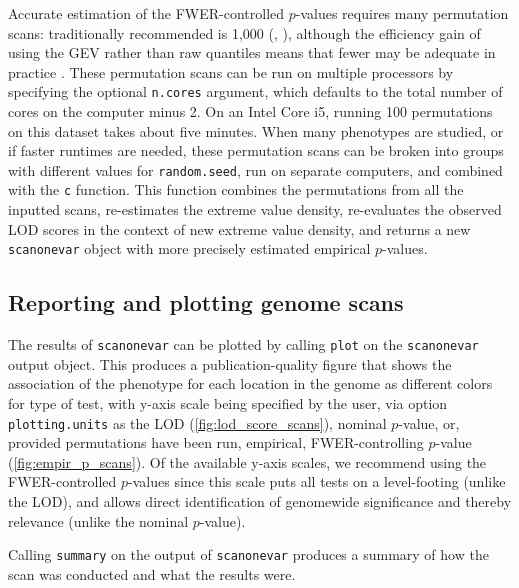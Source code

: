 Accurate estimation of the FWER-controlled $p$-values requires many permutation scans: traditionally recommended is 1,000 (\eg, \citealt{Churchill1994,Carlborg2002}), although the efficiency gain of using the GEV rather than raw quantiles means that fewer may be adequate in practice \citep{Valdar06cc}.
These permutation scans can be run on multiple processors by specifying the optional \texttt{n.cores} argument, which defaults to the total number of cores on the computer minus 2.
On an Intel Core i5, running 100 permutations on this dataset takes about five minutes.
When many phenotypes are studied, or if faster runtimes are needed, these permutation scans can be broken into groups with different values for \texttt{random.seed}, run on separate computers, and combined with the \texttt{c} function.
This function combines the permutations from all the inputted scans, re-estimates the extreme value density, re-evaluates the observed LOD scores in the context of new extreme value density, and returns a new \texttt{scanonevar} object with more precisely estimated empirical $p$-values.

\subsection{Reporting and plotting genome scans}

The results of \texttt{scanonevar} can be plotted by calling \texttt{plot} on the \texttt{scanonevar} output object. This produces a publication-quality figure that shows the association of the phenotype for each location in the genome as different colors for type of test, with y-axis scale being specified by the user, via option \texttt{plotting.units} as the LOD (\autoref{fig:lod_score_scans}), nominal $p$-value, or, provided permutations have been run, empirical, FWER-controlling $p$-value (\autoref{fig:empir_p_scans}). Of the available y-axis scales, we recommend using the FWER-controlled $p$-values since this scale puts all tests on a level-footing (unlike the LOD), and allows direct identification of genomewide significance and thereby relevance (unlike the nominal $p$-value).

Calling \texttt{summary} on the output of \texttt{scanonevar} produces a summary of how the scan was conducted and what the results were.



